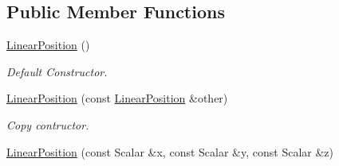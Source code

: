\subsection*{Public Member Functions}
\begin{DoxyCompactItemize}
\item 
\hyperlink{classow__core_1_1LinearPosition_a2ef1d8e782a06e13acd52130f3e2f503}{Linear\+Position} ()\hypertarget{classow__core_1_1LinearPosition_a2ef1d8e782a06e13acd52130f3e2f503}{}\label{classow__core_1_1LinearPosition_a2ef1d8e782a06e13acd52130f3e2f503}

\begin{DoxyCompactList}\small\item\em Default Constructor. \end{DoxyCompactList}\item 
\hyperlink{classow__core_1_1LinearPosition_a1f6ac8d9c57fa09434111abd7f510769}{Linear\+Position} (const \hyperlink{classow__core_1_1LinearPosition}{Linear\+Position} \&other)\hypertarget{classow__core_1_1LinearPosition_a1f6ac8d9c57fa09434111abd7f510769}{}\label{classow__core_1_1LinearPosition_a1f6ac8d9c57fa09434111abd7f510769}

\begin{DoxyCompactList}\small\item\em Copy contructor. \end{DoxyCompactList}\item 
\hyperlink{classow__core_1_1LinearPosition_af540e92398f5d2e28456118570cc3a8e}{Linear\+Position} (const Scalar \&x, const Scalar \&y, const Scalar \&z)\hypertarget{classow__core_1_1LinearPosition_af540e92398f5d2e28456118570cc3a8e}{}\label{classow__core_1_1LinearPosition_af540e92398f5d2e28456118570cc3a8e}


\end{DoxyCompactItemize}

